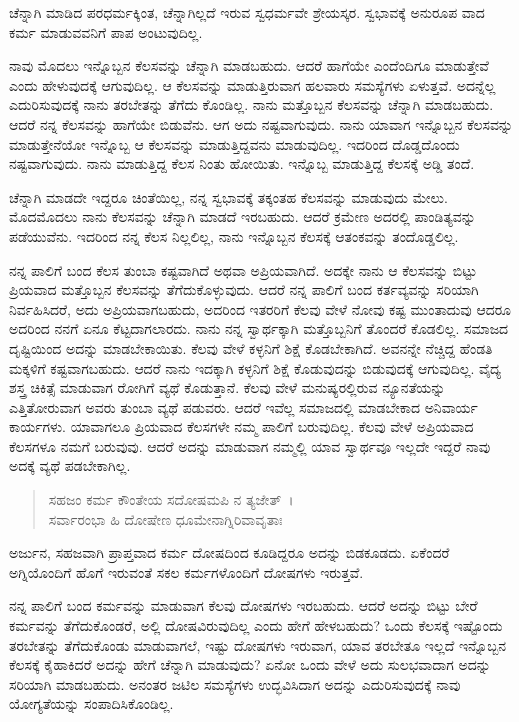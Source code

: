 {\small ಚೆನ್ನಾಗಿ ಮಾಡಿದ ಪರಧರ್ಮಕ್ಕಿಂತ, ಚೆನ್ನಾಗಿಲ್ಲದೆ ಇರುವ ಸ್ವಧರ್ಮವೇ ಶ್ರೇಯಸ್ಕರ. ಸ್ವಭಾವಕ್ಕೆ ಅನುರೂಪ ವಾದ ಕರ್ಮ ಮಾಡುವವನಿಗೆ ಪಾಪ ಅಂಟುವುದಿಲ್ಲ.}

ನಾವು ಮೊದಲು ಇನ್ನೊಬ್ಬನ ಕೆಲಸವನ್ನು ಚೆನ್ನಾಗಿ ಮಾಡಬಹುದು. ಆದರೆ ಹಾಗೆಯೇ ಎಂದೆಂದಿಗೂ ಮಾಡುತ್ತೇವೆ ಎಂದು ಹೇಳುವುದಕ್ಕೆ ಆಗುವುದಿಲ್ಲ. ಆ ಕೆಲಸವನ್ನು ಮಾಡುತ್ತಿರುವಾಗ ಹಲವಾರು ಸಮಸ್ಯೆಗಳು ಏಳುತ್ತವೆ. ಅದನ್ನೆಲ್ಲ ಎದುರಿಸುವುದಕ್ಕೆ ನಾನು ತರಬೇತನ್ನು ತೆಗೆದು ಕೊಂಡಿಲ್ಲ. ನಾನು ಮತ್ತೊಬ್ಬನ ಕೆಲಸವನ್ನು ಚೆನ್ನಾಗಿ ಮಾಡಬಹುದು. ಆದರೆ ನನ್ನ ಕೆಲಸವನ್ನು ಹಾಗೆಯೇ ಬಿಡುವೆನು. ಆಗ ಅದು ನಷ್ಟವಾಗುವುದು. ನಾನು ಯಾವಾಗ ಇನ್ನೊಬ್ಬನ ಕೆಲಸವನ್ನು ಮಾಡುತ್ತೇನೆಯೋ ಇನ್ನೊಬ್ಬ ಆ ಕೆಲಸವನ್ನು ಮಾಡುತ್ತಿದ್ದವನು ಮಾಡುವುದಿಲ್ಲ. ಇದರಿಂದ ದೊಡ್ಡದೊಂದು ನಷ್ಟವಾಗುವುದು. ನಾನು ಮಾಡುತ್ತಿದ್ದ ಕೆಲಸ ನಿಂತು ಹೋಯಿತು. ಇನ್ನೊಬ್ಬ ಮಾಡುತ್ತಿದ್ದ ಕೆಲಸಕ್ಕೆ ಅಡ್ಡಿ ತಂದೆ.

ಚೆನ್ನಾಗಿ ಮಾಡದೇ ಇದ್ದರೂ ಚಿಂತೆಯಿಲ್ಲ, ನನ್ನ ಸ್ವಭಾವಕ್ಕೆ ತಕ್ಕಂತಹ ಕೆಲಸವನ್ನು ಮಾಡುವುದು ಮೇಲು. ಮೊದಮೊದಲು ನಾನು ಕೆಲಸವನ್ನು ಚೆನ್ನಾಗಿ ಮಾಡದೆ ಇರಬಹುದು. ಆದರೆ ಕ್ರಮೇಣ ಅದರಲ್ಲಿ ಪಾಂಡಿತ್ಯವನ್ನು ಪಡೆಯುವೆನು. ಇದರಿಂದ ನನ್ನ ಕೆಲಸ ನಿಲ್ಲಲಿಲ್ಲ, ನಾನು ಇನ್ನೊಬ್ಬನ ಕೆಲಸಕ್ಕೆ ಆತಂಕವನ್ನು ತಂದೊಡ್ಡಲಿಲ್ಲ.

ನನ್ನ ಪಾಲಿಗೆ ಬಂದ ಕೆಲಸ ತುಂಬಾ ಕಷ್ಟವಾಗಿದೆ ಅಥವಾ ಅಪ್ರಿಯವಾಗಿದೆ. ಅದಕ್ಕೇ ನಾನು ಆ ಕೆಲಸವನ್ನು ಬಿಟ್ಟು ಪ್ರಿಯವಾದ ಮತ್ತೊಬ್ಬನ ಕೆಲಸವನ್ನು ತೆಗೆದುಕೊಳ್ಳುವುದು. ಆದರೆ ನನ್ನ ಪಾಲಿಗೆ ಬಂದ ಕರ್ತವ್ಯವನ್ನು ಸರಿಯಾಗಿ ನಿರ್ವಹಿಸಿದರೆ, ಅದು ಅಪ್ರಿಯವಾಗಬಹುದು, ಅದರಿಂದ ಇತರರಿಗೆ ಕೆಲವು ವೇಳೆ ನೋವು ಕಷ್ಟ ಮುಂತಾದುವು ಆದರೂ ಅದರಿಂದ ನನಗೆ ಏನೂ ಕೆಟ್ಟದಾಗಲಾರದು. ನಾನು ನನ್ನ ಸ್ವಾರ್ಥಕ್ಕಾಗಿ ಮತ್ತೊಬ್ಬನಿಗೆ ತೊಂದರೆ ಕೊಡಲಿಲ್ಲ. ಸಮಾಜದ ದೃಷ್ಟಿಯಿಂದ ಅದನ್ನು ಮಾಡಬೇಕಾಯಿತು. ಕೆಲವು ವೇಳೆ ಕಳ್ಳನಿಗೆ ಶಿಕ್ಷೆ ಕೊಡಬೇಕಾಗಿದೆ. ಅವನನ್ನೇ ನೆಚ್ಚಿದ್ದ ಹೆಂಡತಿ ಮಕ್ಕಳಿಗೆ ಕಷ್ಟವಾಗಬಹುದು. ಆದರೆ ನಾನು ಇದಕ್ಕಾಗಿ ಕಳ್ಳನಿಗೆ ಶಿಕ್ಷೆ ಕೊಡುವುದನ್ನು ಬಿಡುವುದಕ್ಕೆ ಆಗುವುದಿಲ್ಲ. ವೈದ್ಯ ಶಸ್ತ್ರ ಚಿಕಿತ್ಸೆ ಮಾಡುವಾಗ ರೋಗಿಗೆ ವ್ಯಥೆ ಕೊಡುತ್ತಾನೆ. ಕೆಲವು ವೇಳೆ ಮನುಷ್ಯರಲ್ಲಿರುವ ನ್ಯೂನತೆಯನ್ನು ಎತ್ತಿತೋರುವಾಗ ಅವರು ತುಂಬಾ ವ್ಯಥೆ ಪಡುವರು. ಆದರೆ ಇವೆಲ್ಲ ಸಮಾಜದಲ್ಲಿ ಮಾಡಬೇಕಾದ ಅನಿವಾರ್ಯ ಕಾರ್ಯಗಳು. ಯಾವಾಗಲೂ ಪ್ರಿಯವಾದ ಕೆಲಸಗಳೇ ನಮ್ಮ ಪಾಲಿಗೆ ಬರುವುದಿಲ್ಲ. ಕೆಲವು ವೇಳೆ ಅಪ್ರಿಯವಾದ ಕೆಲಸಗಳೂ ನಮಗೆ ಬರುವುವು. ಆದರೆ ಅದನ್ನು ಮಾಡುವಾಗ ನಮ್ಮಲ್ಲಿ ಯಾವ ಸ್ವಾರ್ಥವೂ ಇಲ್ಲದೇ ಇದ್ದರೆ ನಾವು ಅದಕ್ಕೆ ವ್ಯಥೆ ಪಡಬೇಕಾಗಿಲ್ಲ.

\begin{verse}
ಸಹಜಂ ಕರ್ಮ ಕೌಂತೇಯ ಸದೋಷಮಪಿ ನ ತ್ಯಜೇತ್~।\\ಸರ್ವಾರಂಭಾ ಹಿ ದೋಷೇಣ ಧೂಮೇನಾಗ್ನಿರಿವಾವೃತಾಃ 
\end{verse}

{\small ಅರ್ಜುನ, ಸಹಜವಾಗಿ ಪ್ರಾಪ್ತವಾದ ಕರ್ಮ ದೋಷದಿಂದ ಕೂಡಿದ್ದರೂ ಅದನ್ನು ಬಿಡಕೂಡದು. ಏಕೆಂದರೆ ಅಗ್ನಿಯೊಂದಿಗೆ ಹೊಗೆ ಇರುವಂತೆ ಸಕಲ ಕರ್ಮಗಳೊಂದಿಗೆ ದೋಷಗಳು ಇರುತ್ತವೆ.}

ನನ್ನ ಪಾಲಿಗೆ ಬಂದ ಕರ್ಮವನ್ನು ಮಾಡುವಾಗ ಕೆಲವು ದೋಷಗಳು ಇರಬಹುದು. ಆದರೆ ಅದನ್ನು ಬಿಟ್ಟು ಬೇರೆ ಕರ್ಮವನ್ನು ತೆಗೆದುಕೊಂಡರೆ, ಅಲ್ಲಿ ದೋಷವಿರುವುದಿಲ್ಲ ಎಂದು ಹೇಗೆ ಹೇಳಬಹುದು? ಒಂದು ಕೆಲಸಕ್ಕೆ ಇಷ್ಟೊಂದು ತರಬೇತನ್ನು ತೆಗೆದುಕೊಂಡು ಮಾಡುವಾಗಲೆ, ಇಷ್ಟು ದೋಷಗಳು ಇರುವಾಗ, ಯಾವ ತರಬೇತೂ ಇಲ್ಲದೆ ಇನ್ನೊಬ್ಬನ ಕೆಲಸಕ್ಕೆ ಕೈಹಾಕಿದರೆ ಅದನ್ನು ಹೇಗೆ ಚೆನ್ನಾಗಿ ಮಾಡುವುದು? ಏನೋ ಒಂದು ವೇಳೆ ಅದು ಸುಲಭವಾದಾಗ ಅದನ್ನು ಸರಿಯಾಗಿ ಮಾಡಬಹುದು. ಅನಂತರ ಜಟಿಲ ಸಮಸ್ಯೆಗಳು ಉದ್ಭವಿಸಿದಾಗ ಅದನ್ನು ಎದುರಿಸುವುದಕ್ಕೆ ನಾವು ಯೋಗ್ಯತೆಯನ್ನು ಸಂಪಾದಿಸಿಕೊಂಡಿಲ್ಲ.

